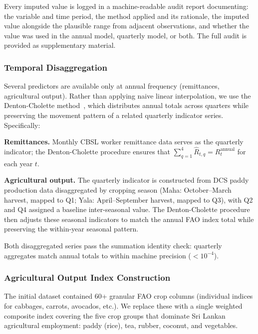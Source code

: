 \documentclass[sigconf]{acmart}
\begin{document}
Every imputed value is logged in a machine-readable audit report
documenting: the variable and time period, the method applied and
its rationale, the imputed value alongside the plausible range
from adjacent observations, and whether the value was used in the
annual model, quarterly model, or both. The full audit is provided
as supplementary material.

\subsubsection{Temporal Disaggregation}

Several predictors are available only at annual frequency
(remittances, agricultural output). Rather than applying naive
linear interpolation, we use the Denton-Cholette
method~\cite{denton1971}, which distributes annual totals across
quarters while preserving the movement pattern of a related
quarterly indicator series. Specifically:

\textbf{Remittances.} Monthly CBSL worker remittance data serves as
the quarterly indicator; the Denton-Cholette procedure ensures that
$\sum_{q=1}^{4} \hat{R}_{t,q} = R_t^{\text{annual}}$ for each year
$t$.

\textbf{Agricultural output.} The quarterly indicator is constructed
from DCS paddy production data disaggregated by cropping season
(Maha: October--March harvest, mapped to Q1; Yala: April--September
harvest, mapped to Q3), with Q2 and Q4 assigned a baseline
inter-seasonal value. The Denton-Cholette procedure then adjusts
these seasonal indicators to match the annual FAO index total while
preserving the within-year seasonal pattern.

Both disaggregated series pass the summation identity check:
quarterly aggregates match annual totals to within machine precision
($< 10^{-4}$).

\subsubsection{Agricultural Output Index Construction}

The initial dataset contained 60+ granular FAO crop columns
(individual indices for cabbages, carrots, avocados, etc.). We
replace these with a single weighted composite index covering
the five crop groups that dominate Sri Lankan agricultural
employment: paddy (rice), tea, rubber, coconut, and vegetables.
\end{document}

